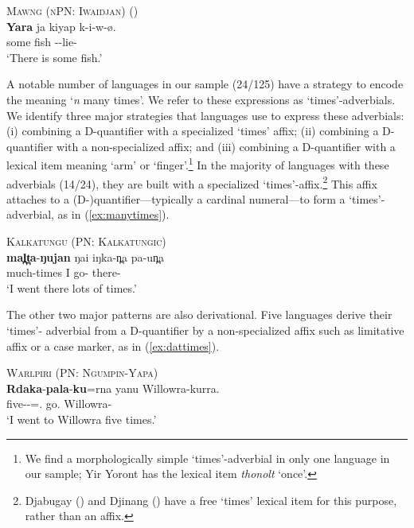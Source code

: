 \documentclass[12pt,egregdoesnotlikesansseriftitles]{scrartcl}
\begin{document}
\begin{exe}
  \ex\label{ex:dyara} \textsc{Mawng (nPN: Iwaidjan)} \hfill (\citealt{ngaralk})\\
  \gll \textbf{Yara} ja kiyap k-i-w-ø.\\
  some \Clm{} fish \Prs-\Tsg\Clm-lie-\Np\\
  \glt `There is some fish.' %
\end{exe}


A notable number of languages in our sample (24/125) have a strategy to encode the meaning `\textit{n} many times'. We refer to these expressions as `times'-adverbials. We identify three major strategies that languages use to express these adverbials: (i) combining a D-quantifier with a specialized `times' affix; (ii) combining a D-quantifier with a non-specialized affix; and (iii) combining a D-quantifier with a lexical item meaning `arm' or `finger'.\footnote{We find a morphologically simple `times'-adverbial in only one language in our sample; Yir Yoront  has the lexical item \textit{thonolt} `once'.}  In the majority of languages with  these adverbials (14/24), they are built with a specialized `times'-affix.\footnote{Djabugay (\citealt{patz91}) and Djinang (\citealt{waters83}) have a free `times' lexical item for this purpose, rather than an affix.} This affix attaches to a (D-)quantifier---typically a cardinal numeral---to form a `times'-adverbial, as in (\ref{ex:manytimes}). 
\begin{exe}
  \ex\label{ex:manytimes} \textsc{Kalkatungu (PN: Kalkatungic)}\hfill {}\\
  \gll \textbf{mal̪t̪a}-\textbf{ŋujan} ŋai iŋka-n̪a pa-un̪a\\
  much-times I go-\Pst{} there-\All\\
  \glt `I went there lots of times.'
\end{exe}

The other two major patterns are also derivational. Five languages derive their `times'- adverbial from a D-quantifier by a non-specialized affix such as limitative affix or a case marker, as in  (\ref{ex:dattimes}).
\begin{exe}
  \ex\label{ex:dattimes} \textsc{Warlpiri (PN: Ngumpin-Yapa)}\hfill {}\\
  \gll \textbf{Rdaka}-\textbf{pala}-\textbf{ku}=rna yanu Willowra-kurra.\\
  five-\Card-\Dat=\Fsg.\Sbj{} go.\Pst{} Willowra-\All\\
  \glt `I went to Willowra five times.'
\end{exe}
  
\end{document}
